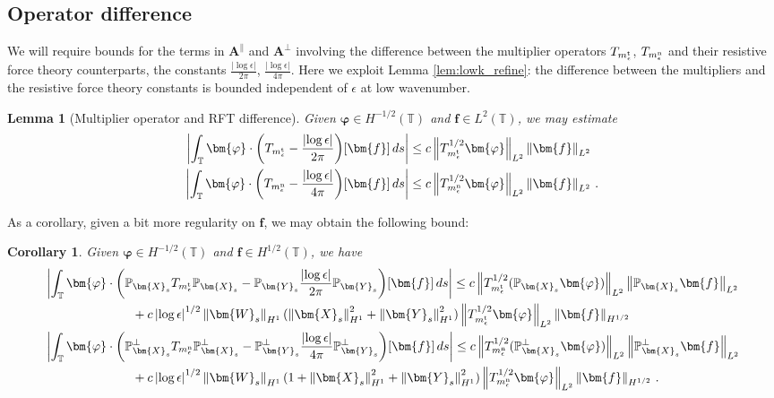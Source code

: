 \documentclass[11pt,reqno]{amsart}
\newcommand{\T}{\mathbb{T}}
\renewcommand{\P}{\mathbb{P}}
\newcommand{\X}{\bm{X}}
\newcommand{\Y}{\bm{Y}}
\newcommand{\abs}[1]{\left\lvert #1 \right\rvert}
\newcommand{\norm}[1]{\left\lVert #1 \right\rVert}
\numberwithin{equation}{section}
\newtheorem{lemma}[theorem]{Lemma}
\newtheorem{corollary}[theorem]{Corollary}
\theoremstyle{definition}
\begin{document}
\subsection{Operator difference}\label{subsec:OpDiff}
We will require bounds for the terms in $\bm{A}^\parallel$ and $\bm{A}^\perp$ involving the difference between the multiplier operators $T_{m_\epsilon^{\rm t}}$, $T_{m_\epsilon^{\rm n}}$ and their resistive force theory counterparts, the constants $\frac{\abs{\log\epsilon}}{2\pi}$, $\frac{\abs{\log\epsilon}}{4\pi}$. Here we exploit Lemma \ref{lem:lowk_refine}: the difference between the multipliers and the resistive force theory constants is bounded independent of $\epsilon$ at low wavenumber. 
% 
\begin{lemma}[Multiplier operator and RFT difference]\label{lem:mult_RFT_diff}
Given $\bm{\varphi}\in H^{-1/2}(\T)$ and $\bm{f}\in L^2(\T)$, we may estimate 
 \begin{equation}
  \begin{aligned}
  \abs{\int_\T\bm{\varphi}\cdot\bigg(T_{m_\epsilon^{\rm t}}-\frac{\abs{\log\epsilon}}{2\pi}\bigg)[\bm{f}]\,ds} 
  &\le c\norm{T_{m_\epsilon^{\rm t}}^{1/2}\bm{\varphi}}_{L^2}\norm{\bm{f}}_{L^2}\\
   \abs{\int_\T\bm{\varphi}\cdot\bigg(T_{m_\epsilon^{\rm n}}-\frac{\abs{\log\epsilon}}{4\pi}\bigg)[\bm{f}]\,ds} 
   &\le c\norm{T_{m_\epsilon^{\rm n}}^{1/2}\bm{\varphi}}_{L^2}\norm{\bm{f}}_{L^2}\,.
\end{aligned}
\end{equation}
\end{lemma}
%
%
%
As a corollary, given a bit more regularity on $\bm{f}$, we may obtain the following bound: 
\begin{corollary}\label{cor:mult_RFT_diff}
  Given $\bm{\varphi}\in H^{-1/2}(\T)$ and $\bm{f}\in H^{1/2}(\T)$, we have 
 \begin{equation}
  \begin{aligned}
  &\abs{\int_\T\bm{\varphi}\cdot\bigg(\P_{\X_s} T_{m_\epsilon^{\rm t}}\P_{\X_s} -\P_{\Y_s}\frac{\abs{\log\epsilon}}{2\pi}\P_{\Y_s}\bigg)[\bm{f}]\,ds} 
  \le c\norm{T_{m_\epsilon^{\rm t}}^{1/2}(\P_{\X_s}\bm{\varphi})}_{L^2}\norm{\P_{\X_s}\bm{f}}_{L^2}\\
  &\qquad\qquad\qquad\quad + c\abs{\log\epsilon}^{1/2}\norm{\bm{W}_s}_{H^1}(\norm{\X_s}_{H^1}^2+\norm{\Y_s}_{H^1}^2)\norm{T_{m_\epsilon^{\rm t}}^{1/2}\bm{\varphi}}_{L^2}\norm{\bm{f}}_{H^{1/2}}\\
   &\abs{\int_\T\bm{\varphi}\cdot\bigg(\P_{\X_s}^\perp T_{m_\epsilon^{\rm n}}\P_{\X_s}^\perp-\P_{\Y_s}^\perp\frac{\abs{\log\epsilon}}{4\pi}\P_{\Y_s}^\perp\bigg)[\bm{f}]\,ds} 
   \le c\norm{T_{m_\epsilon^{\rm n}}^{1/2}(\P_{\X_s}^\perp\bm{\varphi})}_{L^2}\norm{\P_{\X_s}^\perp\bm{f}}_{L^2}\\
  &\qquad\qquad\qquad\quad + c\abs{\log\epsilon}^{1/2}\norm{\bm{W}_s}_{H^1}(1+\norm{\X_s}_{H^1}^2+\norm{\Y_s}_{H^1}^2)\norm{T_{m_\epsilon^{\rm n}}^{1/2}\bm{\varphi}}_{L^2}\norm{\bm{f}}_{H^{1/2}}\,.
\end{aligned}
\end{equation}
\end{corollary}
\end{document}
